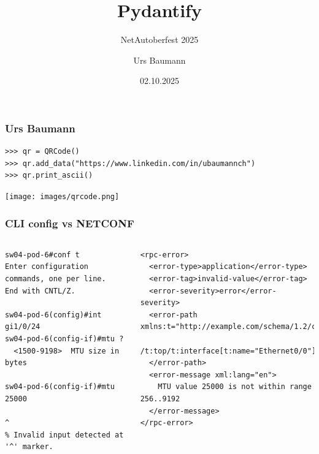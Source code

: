 \documentclass[aspectratio=169]{beamer}
\title{Pydantify}
\subtitle{NetAutoberfest 2025}
\author{Urs Baumann}
\date{02.10.2025}
\begin{document}
{
\frame{\titlepage}
}


\begin{frame}[fragile]
  \frametitle{Urs Baumann}

  \begin{verbatim}
>>> qr = QRCode()
>>> qr.add_data("https://www.linkedin.com/in/ubaumannch")
>>> qr.print_ascii()
  \end{verbatim}

  \texttt{[image: images/qrcode.png]}

\end{frame}


\begin{frame}[fragile]
  \frametitle{CLI config vs NETCONF}

  \begin{columns}
        \begin{verbatim}
sw04-pod-6#conf t
Enter configuration commands, one per line.
End with CNTL/Z.

sw04-pod-6(config)#int gi1/0/24
sw04-pod-6(config-if)#mtu ?
  <1500-9198>  MTU size in bytes

sw04-pod-6(config-if)#mtu 25000
                              ^
% Invalid input detected at '^' marker.
\end{verbatim}
        \begin{verbatim}
<rpc-error>
  <error-type>application</error-type>
  <error-tag>invalid-value</error-tag>
  <error-severity>error</error-severity>
  <error-path xmlns:t="http://example.com/schema/1.2/config">
    /t:top/t:interface[t:name="Ethernet0/0"]/t:mtu
  </error-path>
  <error-message xml:lang="en">
    MTU value 25000 is not within range 256..9192
  </error-message>
</rpc-error>
\end{verbatim}
    \end{columns}

    
\end{frame}
\end{document}
